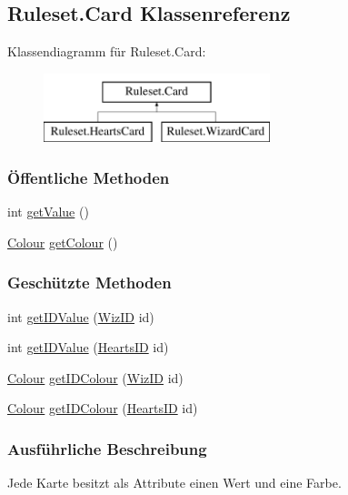 \hypertarget{a00002}{\subsection{Ruleset.\-Card Klassenreferenz}
\label{a00002}
}
Klassendiagramm für Ruleset.\-Card\-:\begin{figure}[H]
\begin{center}
\leavevmode
\includegraphics[height=2.000000cm]{a00002}
\end{center}
\end{figure}
\subsubsection*{Öffentliche Methoden}
\begin{DoxyCompactItemize}
\item 
int \hyperlink{a00002_aaf934c1e211ce78f23e9b0b685b50ef7}{get\-Value} ()
\item 
\hyperlink{a00017}{Colour} \hyperlink{a00002_a7d3f7687dbc63596b023b0027cb76c73}{get\-Colour} ()
\end{DoxyCompactItemize}
\subsubsection*{Geschützte Methoden}
\begin{DoxyCompactItemize}
\item 
int \hyperlink{a00002_a2e55108b4eedccea4602a654c6f9a946}{get\-I\-D\-Value} (\hyperlink{a00089}{Wiz\-I\-D} id)
\item 
int \hyperlink{a00002_a8108dadc5732c0a6c5cd05792396f09a}{get\-I\-D\-Value} (\hyperlink{a00050}{Hearts\-I\-D} id)
\item 
\hyperlink{a00017}{Colour} \hyperlink{a00002_a10ab8b61429fc31291536414aa732421}{get\-I\-D\-Colour} (\hyperlink{a00089}{Wiz\-I\-D} id)
\item 
\hyperlink{a00017}{Colour} \hyperlink{a00002_a4e392dcc891566105b2fe9b3c17bc592}{get\-I\-D\-Colour} (\hyperlink{a00050}{Hearts\-I\-D} id)
\end{DoxyCompactItemize}


\subsubsection{Ausführliche Beschreibung}
Jede Karte besitzt als Attribute einen Wert und eine Farbe. 

